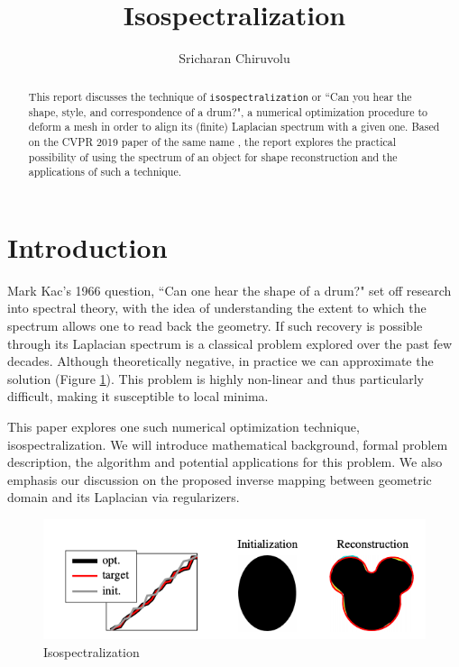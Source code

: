 \documentclass[a4paper,10pt]{article}
\title{Isospectralization}
\author{Sricharan Chiruvolu} %
\institute{Department of Informatics - Technische Universit\"{a}t M\"{u}nchen} %
\begin{document}
\maketitle

\begin{abstract}

This report discusses the technique of \texttt{isospectralization} or ``Can you hear the shape, style, and correspondence of a drum?", a numerical optimization procedure to deform a mesh in order to align its (finite) Laplacian spectrum with a given one. Based on the CVPR 2019 paper of the same name \cite{cosmo2018isospectralization}, the report explores the practical possibility of using the spectrum of an object for shape reconstruction and the applications of such a technique.

\end{abstract}

\section{Introduction}

Mark Kac’s 1966 question, ``Can one hear the shape of a drum?" \cite{kac1966can}
set off research into spectral theory, with the idea of understanding
the extent to which the spectrum allows one to read back the
geometry. If such recovery is possible through its Laplacian spectrum
is a classical problem explored over the past few decades. Although theoretically negative, in practice we can approximate the solution (Figure \ref{fig:Isospectralization}). This problem is highly non-linear and thus particularly difficult, making it susceptible to local minima.

This paper explores one such numerical optimization technique, isospectralization. We will introduce mathematical background, formal problem description, the algorithm and potential applications for this problem. We also emphasis our discussion on the proposed inverse mapping between geometric domain and its Laplacian via  regularizers.

\begin{figure}[hbt!]
    \centering
    \includegraphics[height=0.2\textwidth]{Spectral.png}
    \caption{Isospectralization}
    \label{fig:Isospectralization}
\end{figure}
\end{document}
